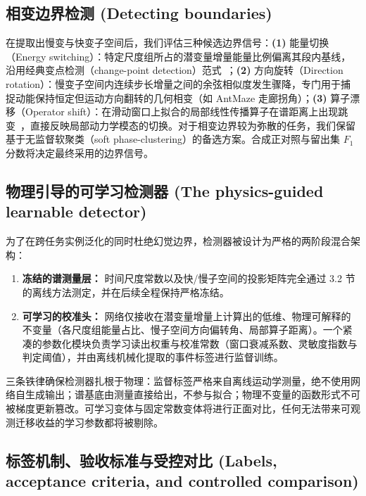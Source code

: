 \documentclass[11pt]{article}
\begin{document}
\subsection{相变边界检测 (Detecting boundaries)}

在提取出慢变与快变子空间后，我们评估三种候选边界信号：\textbf{(1)} 能量切换（Energy switching）：特定尺度组所占的潜变量增量能量比例偏离其段内基线，沿用经典变点检测（change-point detection）范式~\cite{page1954cusum,killick2012pelt,adams2007bocpd}；\textbf{(2)} 方向旋转（Direction rotation）：慢变子空间内连续步长增量之间的余弦相似度发生骤降，专门用于捕捉动能保持恒定但运动方向翻转的几何相变（如 AntMaze 走廊拐角）；\textbf{(3)} 算子漂移（Operator shift）：在滑动窗口上拟合的局部线性传播算子在谱距离上出现跳变~\cite{dmd,arbabi17}，直接反映局部动力学模态的切换。对于相变边界较为弥散的任务，我们保留基于无监督软聚类（soft phase-clustering）的备选方案。合成正对照与留出集 $F_1$ 分数将决定最终采用的边界信号。

\subsection{物理引导的可学习检测器 (The physics-guided learnable detector)}

为了在跨任务实例泛化的同时杜绝幻觉边界，检测器被设计为严格的两阶段混合架构：
\begin{enumerate}[leftmargin=*, nosep]
    \item \textbf{冻结的谱测量层：} 时间尺度常数以及快/慢子空间的投影矩阵完全通过 3.2 节的离线方法测定，并在后续全程保持严格冻结。
    \item \textbf{可学习的校准头：} 网络仅接收在潜变量增量上计算出的低维、物理可解释的不变量（各尺度组能量占比、慢子空间方向偏转角、局部算子距离）。一个紧凑的参数化模块负责学习读出权重与校准常数（窗口衰减系数、灵敏度指数与判定阈值），并由离线机械化提取的事件标签进行监督训练。
\end{enumerate}

三条铁律确保检测器扎根于物理：监督标签严格来自离线运动学测量，绝不使用网络自生成输出；谱基底由测量直接给出，不参与拟合；物理不变量的函数形式不可被梯度更新篡改。可学习变体与固定常数变体将进行正面对比，任何无法带来可观测迁移收益的学习参数都将被剔除。

\subsection{标签机制、验收标准与受控对比 (Labels, acceptance criteria, and controlled comparison)}
\end{document}
